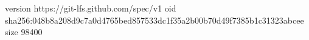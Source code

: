 version https://git-lfs.github.com/spec/v1
oid sha256:048b8a208d9c7a0d4765bed857533dc1f35a2b00b70d49f7385b1c31323abcee
size 98400
